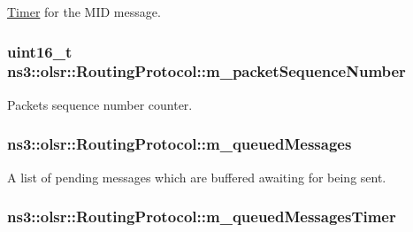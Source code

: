 \hyperlink{classns3_1_1Timer}{Timer} for the M\+ID message. 

\subsubsection[{\texorpdfstring{m\+\_\+packet\+Sequence\+Number}{m_packetSequenceNumber}}]{\setlength{\rightskip}{0pt plus 5cm}uint16\+\_\+t ns3\+::olsr\+::\+Routing\+Protocol\+::m\+\_\+packet\+Sequence\+Number\hspace{0.3cm}{\ttfamily [private]}}\hypertarget{classns3_1_1olsr_1_1RoutingProtocol_aa5051691fb81c7109b9e2b6c54b43b7f}{}\label{classns3_1_1olsr_1_1RoutingProtocol_aa5051691fb81c7109b9e2b6c54b43b7f}


Packets sequence number counter. 

\subsubsection[{\texorpdfstring{m\+\_\+queued\+Messages}{m_queuedMessages}}]{ ns3\+::olsr\+::\+Routing\+Protocol\+::m\+\_\+queued\+Messages\hspace{0.3cm}{\ttfamily [private]}}\hypertarget{classns3_1_1olsr_1_1RoutingProtocol_a1366596191a80005da6f45af00585d1d}{}\label{classns3_1_1olsr_1_1RoutingProtocol_a1366596191a80005da6f45af00585d1d}


A list of pending messages which are buffered awaiting for being sent. 

\subsubsection[{\texorpdfstring{m\+\_\+queued\+Messages\+Timer}{m_queuedMessagesTimer}}]{ ns3\+::olsr\+::\+Routing\+Protocol\+::m\+\_\+queued\+Messages\+Timer\hspace{0.3cm}{\ttfamily [private]}}\hypertarget{classns3_1_1olsr_1_1RoutingProtocol_a8b54985da7787840baa68ce4781e5d76}{}\label{classns3_1_1olsr_1_1RoutingProtocol_a8b54985da7787840baa68ce4781e5d76}


